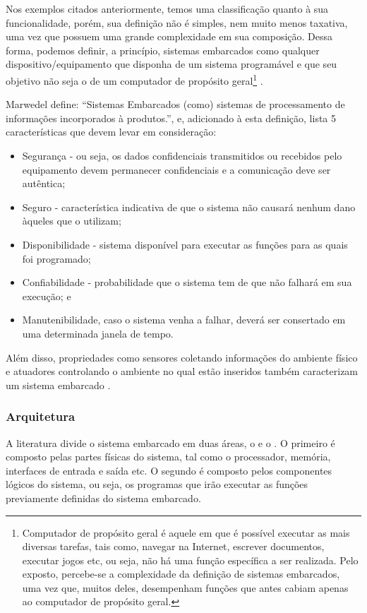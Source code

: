Nos exemplos citados anteriormente, temos uma classificação quanto à sua
funcionalidade, porém, sua definição não é simples, nem muito menos taxativa,
uma vez que possuem uma grande complexidade em sua composição. Dessa forma,
podemos definir, a princípio, sistemas embarcados como qualquer
dispositivo/equipamento que disponha de um sistema programável e que seu
objetivo não seja o de um computador de propósito geral\footnote{Computador de
propósito geral é aquele em que é possível executar as mais diversas tarefas,
tais como, navegar na Internet, escrever documentos, executar jogos etc, ou
seja, não há uma função específica a ser realizada. Pelo exposto, percebe-se a
complexidade da definição de sistemas embarcados, uma vez que, muitos deles, 
desempenham funções que antes cabiam apenas ao computador de propósito geral.}
\cite{wolf2012computers}.

Marwedel define: ``Sistemas Embarcados (como) sistemas de processamento de
informações incorporados à produtos.'', e, adicionado à esta definição, lista 5
características que devem levar em consideração: 

\begin{itemize}
  \item Segurança - ou seja, os dados confidenciais transmitidos ou recebidos pelo
  equipamento devem permanecer confidenciais e a comunicação deve ser autêntica;
  \item Seguro - característica indicativa de que o sistema não causará nenhum dano àqueles que o utilizam;
  \item Disponibilidade - sistema disponível para executar as funções para as quais
  foi programado; 
  \item Confiabilidade - probabilidade que o sistema tem de que não
  falhará em sua execução; e
  \item Manutenibilidade, caso o sistema venha a falhar, deverá 
  ser consertado em uma determinada janela de tempo.
\end{itemize}

Além disso, propriedades como sensores coletando informações do ambiente
físico e atuadores controlando o ambiente no qual estão inseridos também
caracterizam um sistema embarcado \cite{marwedel2010embedded}.

\subsubsection{Arquitetura}\label{subsubsec:arquitetura}

A literatura divide o sistema embarcado em duas áreas, o \hardware[] e o 
\software. O primeiro é composto pelas partes físicas do sistema, 
tal como o processador, memória, interfaces de entrada e saída etc. O segundo é
composto pelos componentes lógicos do sistema, ou seja, os programas que 
irão executar as funções previamente definidas do sistema embarcado.

